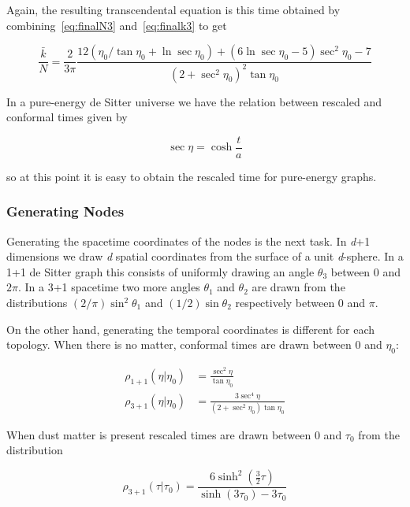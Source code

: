 \documentclass[preprint,notitlepage,amsmath,amssymb,floatfix]{revtex4-1}
\begin{document}
\noindent Again, the resulting transcendental equation is this time obtained by combining~\eqref{eq:finalN3} and~\eqref{eq:finalk3} to get

\begin{equation}
\label{eq:trans3}
\frac{\bar k}{N} = \frac{2}{3\pi}\frac{12\left(\eta_0/\tan\eta_0 + \ln\sec\eta_0\right) + \left(6\ln\sec\eta_0 - 5\right)\sec^2\eta_0 - 7}{\left(2+\sec^2\eta_0\right)^2\tan\eta_0}
\end{equation}

\noindent In a pure-energy de Sitter universe we have the relation between rescaled and conformal times given by 

\begin{equation}
\sec\eta = \cosh\frac{t}{a}
\end{equation}

\noindent so at this point it is easy to obtain the rescaled time for pure-energy graphs.
\subsubsection{Generating Nodes}
Generating the spacetime coordinates of the nodes is the next task.  
In \textit{d}+1 dimensions we draw \textit{d} spatial coordinates from the surface of a unit \textit{d}-sphere.  
In a 1+1 de Sitter graph this consists of uniformly drawing an angle $\theta_3$ between 0 and $2\pi$.  
In a 3+1 spacetime two more angles $\theta_1$ and $\theta_2$ are drawn from the distributions $\left(2/\pi\right)\sin^2\theta_1$ and $\left(1/2\right)\sin\theta_2$ respectively between 0 and $\pi$. \par
On the other hand, generating the temporal coordinates is different for each topology.
When there is no matter, conformal times are drawn between 0 and $\eta_0$:

\begin{align}
\rho_{1+1}\left(\eta|\eta_0\right) &= \frac{\sec^2\eta}{\tan\eta_0} \\
\rho_{3+1}\left(\eta|\eta_0\right) &= \frac{3\sec^4\eta}{\left(2+\sec^2\eta_0\right)\tan\eta_0}
\end{align}

\noindent When dust matter is present rescaled times are drawn between 0 and $\tau_0$ from the distribution

\begin{equation}
\label{eq:rhotau3}
\rho_{3+1}\left(\tau|\tau_0\right) = \frac{6\sinh^2\left(\frac{3}{2}\tau\right)}{\sinh\left(3\tau_0\right) - 3\tau_0}
\end{equation}
\end{document}
